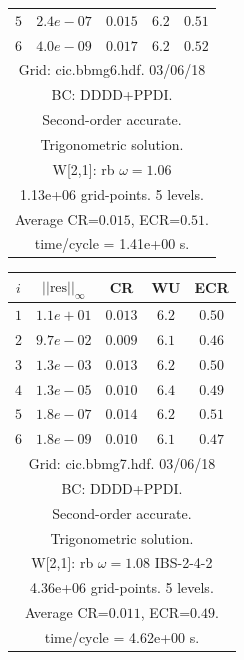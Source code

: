 \begin{table}[hbt]
\begin{center}
{\begin{tabular}{|c|c|c|c|c|}
 $ 5$  & $ 2.4e-07$ & $0.015$ & $ 6.2$ & $0.51$ \\ 
 $ 6$  & $ 4.0e-09$ & $0.017$ & $ 6.2$ & $0.52$ \\ 
\hline 
\multicolumn{5}{|c|}{Grid: cic.bbmg6.hdf. 03/06/18}  \\
\multicolumn{5}{|c|}{BC: DDDD+PPDI.}  \\
\multicolumn{5}{|c|}{Second-order accurate.}  \\
\multicolumn{5}{|c|}{Trigonometric solution.}  \\
\multicolumn{5}{|c|}{W[2,1]: rb $\omega=1.06$}  \\
\multicolumn{5}{|c|}{1.13e+06 grid-points. 5 levels.}  \\
\multicolumn{5}{|c|}{Average CR=$0.015$, ECR=$0.51$.}  \\
\multicolumn{5}{|c|}{time/cycle = 1.41e+00 s.}  \\
\hline 
\end{tabular}
\begin{tabular}{|c|c|c|c|c|} \hline 
 $i$   & $\vert\vert\mbox{res}\vert\vert_\infty$  &  CR     &  WU    & ECR  \\   \hline 
 $ 1$  & $ 1.1e+01$ & $0.013$ & $ 6.2$ & $0.50$ \\ 
 $ 2$  & $ 9.7e-02$ & $0.009$ & $ 6.1$ & $0.46$ \\ 
 $ 3$  & $ 1.3e-03$ & $0.013$ & $ 6.2$ & $0.50$ \\ 
 $ 4$  & $ 1.3e-05$ & $0.010$ & $ 6.4$ & $0.49$ \\ 
 $ 5$  & $ 1.8e-07$ & $0.014$ & $ 6.2$ & $0.51$ \\ 
 $ 6$  & $ 1.8e-09$ & $0.010$ & $ 6.1$ & $0.47$ \\ 
\hline 
\multicolumn{5}{|c|}{Grid: cic.bbmg7.hdf. 03/06/18}  \\
\multicolumn{5}{|c|}{BC: DDDD+PPDI.}  \\
\multicolumn{5}{|c|}{Second-order accurate.}  \\
\multicolumn{5}{|c|}{Trigonometric solution.}  \\
\multicolumn{5}{|c|}{W[2,1]: rb $\omega=1.08$ IBS-2-4-2}  \\
\multicolumn{5}{|c|}{4.36e+06 grid-points. 5 levels.}  \\
\multicolumn{5}{|c|}{Average CR=$0.011$, ECR=$0.49$.}  \\
\multicolumn{5}{|c|}{time/cycle = 4.62e+00 s.}  \\
\hline 
\end{tabular}
\begin{tabular}{|c|c|c|c|c|} \hline 

\end{tabular}}
\end{center}
\end{table}
